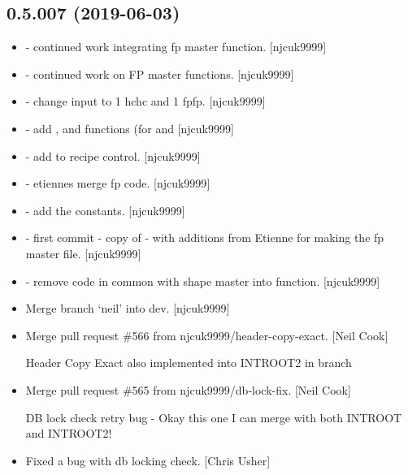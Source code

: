 \documentclass[a4paper,10pt,english]{report}
\begin{document}
\subsection{0.5.007 (2019-06-03)}
\label{\detokenize{misc/changelog:id130}}\begin{itemize}
\item {} 
 - continued work integrating fp master function.
{[}njcuk9999{]}

\item {} 
 - continued work on FP master functions. {[}njcuk9999{]}

\item {} 
 - change input to 1 hchc and 1 fpfp. {[}njcuk9999{]}

\item {} 
 - add ,  and
 functions (for  and 
{[}njcuk9999{]}

\item {} 
 - add  to recipe control.
{[}njcuk9999{]}

\item {} 
 - etiennes merge fp code. {[}njcuk9999{]}

\item {} 
 - add the  constants.
{[}njcuk9999{]}

\item {} 
 - first commit - copy of  -
with additions from Etienne for making the fp master file. {[}njcuk9999{]}

\item {} 
 - remove code in common with shape master
into function. {[}njcuk9999{]}

\item {} 
Merge branch ‘neil’ into dev. {[}njcuk9999{]}

\item {} 
Merge pull request \#566 from njcuk9999/header-copy-exact. {[}Neil Cook{]}

Header Copy Exact \textendash{} also implemented into INTROOT2 in  branch

\item {} 
Merge pull request \#565 from njcuk9999/db-lock-fix. {[}Neil Cook{]}

DB lock check retry bug - Okay this one I can merge with both INTROOT and INTROOT2!

\item {} 
Fixed a bug with db locking check. {[}Chris Usher{]}

\end{itemize}
\end{document}
